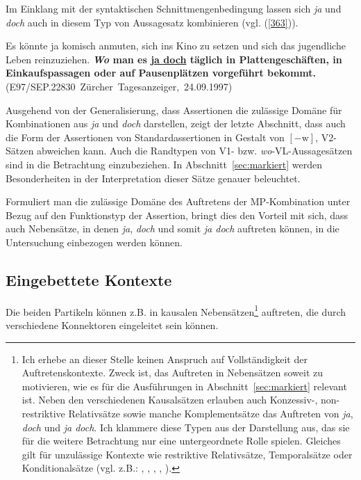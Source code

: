 Im Einklang mit der syntaktischen Schnittmengenbedingung lassen sich \textit{ja} und \textit{doch} auch in diesem Typ von Aussagesatz kombinieren (vgl. (\ref{363})).

\begin{exe}
	\ex\label{363} 
	\scriptsize
	Es könnte ja komisch anmuten, sich ins Kino zu setzen und sich das jugendliche Leben reinzuziehen. \textbf{\textit{Wo} man es \underline{ja doch} 			täglich in Plattengeschäften, in Einkaufspassagen oder auf Pausenplätzen vorgeführt bekommt.}
	\hfill\hbox{(E97/SEP.22830 Zürcher Tagesanzeiger, 24.09.1997)}	
\end{exe}
Ausgehend von der Generalisierung, dass Assertionen die zulässige Domäne für Kombinationen aus \textit{ja} und \textit{doch} darstellen, zeigt der letzte Abschnitt, dass auch die Form der Assertionen von Standardassertionen in Gestalt von $[ \minus \textrm{w}]$, V2-Sätzen abweichen kann. Auch die Randtypen von V1- bzw. \textit{wo}-VL-Aussagesätzen sind in die Betrachtung einzubeziehen. In Abschnitt~\ref{sec:markiert} werden Besonderheiten in der Interpretation dieser Sätze genauer beleuchtet. 

Formuliert man die zulässige Domäne des Auftretens der MP-Kombination unter Bezug auf den Funktionstyp der Assertion, bringt dies den Vorteil mit sich, dass auch Nebensätze, in denen \textit{ja}, \textit{doch} und somit \textit{ja doch} auftreten können, in die Untersuchung einbezogen werden können. 

\subsection{Eingebettete Kontexte}
\label{sec:eingkon}
Die beiden Partikeln können z.B. in kausalen Nebensätzen\footnote{Ich erhebe an dieser Stelle keinen Anspruch auf Vollständigkeit der Auftretenskontexte. Zweck ist, das Auftreten in Nebensätzen soweit zu motivieren, wie es für die Ausführungen in Abschnitt~\ref{sec:markiert} relevant ist. Neben den verschiedenen Kausalsätzen erlauben auch Konzessiv-, non-restriktive Relativsätze sowie manche Komplementsätze das Auftreten von \textit{ja}, \textit{doch} und \textit{ja doch}. Ich klammere diese Typen aus der Darstellung aus, das sie für die weitere Betrachtung nur eine untergeordnete Rolle spielen. Gleiches gilt für unzulässige Kontexte wie restriktive Re\-lativsätze, Temporalsätze oder Konditionalsätze (vgl. z.B.: \citealt[11]{Borst1985}, \citealt[76]{Thurmair1989} \citealt[166]{Helbig1994}, \citealt[115]{Coniglio2007}, \citealt[139/152/147/152]{Coniglio2011}, \citealt[59]{Frey2011}).} auftreten, die durch verschiedene Konnektoren eingeleitet sein können.

